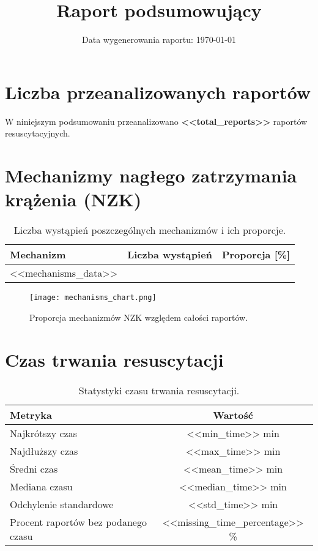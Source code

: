 \documentclass[a4paper,12pt]{article}
\title{Raport podsumowujący}
\date{Data wygenerowania raportu: \today}
\begin{document}
\maketitle
\section*{Liczba przeanalizowanych raportów}
W niniejszym podsumowaniu przeanalizowano \textbf{<<total_reports>>} raportów resuscytacyjnych.

\section{Mechanizmy nagłego zatrzymania krążenia (NZK)}
\begin{table}[H]
\centering
\begin{tabular}{@{}lcc@{}}
\toprule
Mechanizm & Liczba wystąpień & Proporcja [\%] \\ \midrule
<<mechanisms_data>> \bottomrule
\end{tabular}
\caption{Liczba wystąpień poszczególnych mechanizmów i ich proporcje.}
\end{table}

\begin{figure}[H]
    \centering
    \texttt{[image: mechanisms\_chart.png]}
    \caption{Proporcja mechanizmów NZK względem całości raportów.}
\end{figure}

\section{Czas trwania resuscytacji}
\begin{table}[H]
\centering
\begin{tabular}{@{}lc@{}}
\toprule
Metryka & Wartość \\ \midrule
Najkrótszy czas & <<min_time>> min \\
Najdłuższy czas & <<max_time>> min \\
Średni czas & <<mean_time>> min \\
Mediana czasu & <<median_time>> min \\
Odchylenie standardowe & <<std_time>> min \\
Procent raportów bez podanego czasu & <<missing_time_percentage>> \% \\ \bottomrule
\end{tabular}
\caption{Statystyki czasu trwania resuscytacji.}
\end{table}
\end{document}
